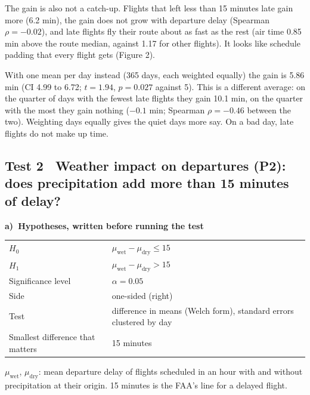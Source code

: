 \documentclass[10pt,a4paper,twocolumn]{article}
\newcommand{\egblock}[1]{{\color{eg}#1\par}}
\newcommand{\tpart}[2]{\par\needspace{12\baselineskip}\smallskip\textbf{#1)~#2}\par}
\begin{document}
\egblock{The gain is also not a catch-up. Flights that left less than 15 minutes late gain more
(6.2 min), the gain does not grow with departure delay (Spearman $\rho=-0.02$), and late flights
fly their route about as fast as the rest (air time 0.85 min above the route median, against
1.17 for other flights). It looks like schedule padding that every flight gets (Figure 2).}

\egblock{With one mean per day instead (365 days, each weighted equally) the gain is 5.86 min
(CI 4.99 to 6.72; $t=1.94$, $p=0.027$ against 5). This is a different average: on the quarter of
days with the fewest late flights they gain 10.1 min, on the quarter with the most they gain
nothing ($-0.1$ min; Spearman $\rho=-0.46$ between the two). Weighting days equally gives the
quiet days more say. On a bad day, late flights do not make up time.}

\subsection*{Test 2 \textbullet\ Weather impact on departures (P2): does precipitation add more
than 15 minutes of delay?}

\tpart{a}{Hypotheses, written before running the test}
{\small
\begin{tabularx}{\linewidth}{@{}K{3.4cm} Y@{}}
\toprule
$H_0$ & $\mu_{\text{wet}}-\mu_{\text{dry}}\le15$ \\
$H_1$ & $\mu_{\text{wet}}-\mu_{\text{dry}}>15$ \\
Significance level & $\alpha=0.05$ \\
Side & one-sided (right) \\
Test & difference in means (Welch form), standard errors clustered by day \\
Smallest difference that matters & 15 minutes \\
\bottomrule
\end{tabularx}}

\egblock{$\mu_{\text{wet}}$, $\mu_{\text{dry}}$: mean departure delay of flights scheduled in an
hour with and without precipitation at their origin. 15 minutes is the FAA's line for a delayed
flight.}
\end{document}
